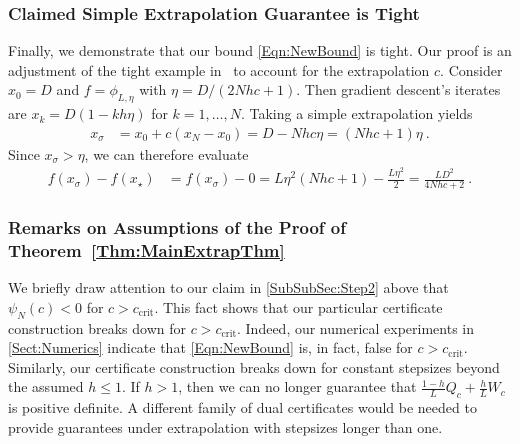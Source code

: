 \documentclass[11pt]{article}
\numberwithin{equation}{section}
\theoremstyle{definition}
\theoremstyle{definition}
\theoremstyle{definition}
\newcommand{\1}{\mathbf{1}}
\newcommand{\xStar}{x_\star}
\newcommand{\xSpecial}{x_\sigma}
\newcommand{\cCrit}{c_\mathrm{crit}}
\begin{document}
\subsubsection{Claimed Simple Extrapolation Guarantee is Tight}  \label{SubSubSec:Step4}
Finally, we demonstrate that our bound \eqref{Eqn:NewBound} is tight. Our proof is an adjustment of the tight example in~\cite[Theorem 3.2]{FirstPEP} to account for the extrapolation $c$. Consider $x_0=D$ and $f=\phi_{L,\eta}$ with $\eta = D/(2Nhc+1)$.
Then gradient descent's iterates are $x_k = D(1-kh\eta)$ for $k=1,\dots,N$. Taking a simple extrapolation yields
    \begin{align*}
            \xSpecial &= x_0 + c(x_N-x_0) = D - Nhc\eta 
            = (Nhc+1)\eta \ . 
    \end{align*}
    Since $\xSpecial > \eta$, we can therefore evaluate
    \begin{align*}
        f(\xSpecial) -f(\xStar) &= f(\xSpecial) - 0= L\eta^2(Nhc+1) - \frac{L\eta^2}{2}  = \frac{LD^2}{4Nhc+2} \ . 
    \end{align*}

\subsubsection{Remarks on Assumptions of the Proof of Theorem~\ref{Thm:MainExtrapThm}}
We briefly draw attention to our claim in \cref{SubSubSec:Step2} above that $\psi_N(c) < 0$ for $c > \cCrit$. This fact shows that our particular certificate construction breaks down for $c>\cCrit$. Indeed, our numerical experiments in \cref{Sect:Numerics} indicate that \eqref{Eqn:NewBound} is, in fact, false for $c>\cCrit$.
Similarly, our certificate construction breaks down for constant stepsizes beyond the assumed $h \leq 1$. If $h>1$, then we can no longer guarantee that $\frac{1-h}{L}Q_c + \frac{h}{L}W_c$ is positive definite. A different family of dual certificates would be needed to provide guarantees under extrapolation with stepsizes longer than one.
\end{document}
